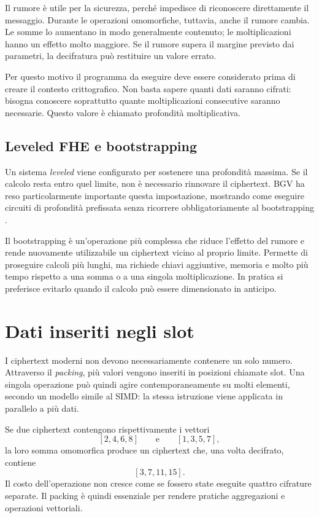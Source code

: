 Il rumore \`e utile per la sicurezza, perch\'e impedisce di riconoscere direttamente il messaggio. Durante le operazioni omomorfiche, tuttavia, anche il rumore cambia. Le somme lo aumentano in modo generalmente contenuto; le moltiplicazioni hanno un effetto molto maggiore. Se il rumore supera il margine previsto dai parametri, la decifratura pu\`o restituire un valore errato.

Per questo motivo il programma da eseguire deve essere considerato prima di creare il contesto crittografico. Non basta sapere quanti dati saranno cifrati: bisogna conoscere soprattutto quante moltiplicazioni consecutive saranno necessarie. Questo valore \`e chiamato profondit\`a moltiplicativa.

\subsection{Leveled FHE e bootstrapping}
Un sistema \emph{leveled} viene configurato per sostenere una profondit\`a massima. Se il calcolo resta entro quel limite, non \`e necessario rinnovare il ciphertext. BGV ha reso particolarmente importante questa impostazione, mostrando come eseguire circuiti di profondit\`a prefissata senza ricorrere obbligatoriamente al bootstrapping \cite{bgv}.

Il bootstrapping \`e un'operazione pi\`u complessa che riduce l'effetto del rumore e rende nuovamente utilizzabile un ciphertext vicino al proprio limite. Permette di proseguire calcoli pi\`u lunghi, ma richiede chiavi aggiuntive, memoria e molto pi\`u tempo rispetto a una somma o a una singola moltiplicazione. In pratica si preferisce evitarlo quando il calcolo pu\`o essere dimensionato in anticipo.

\section{Dati inseriti negli slot}
I ciphertext moderni non devono necessariamente contenere un solo numero. Attraverso il \emph{packing}, pi\`u valori vengono inseriti in posizioni chiamate slot. Una singola operazione pu\`o quindi agire contemporaneamente su molti elementi, secondo un modello simile al SIMD: la stessa istruzione viene applicata in parallelo a pi\`u dati.

Se due ciphertext contengono rispettivamente i vettori
\[
[2,4,6,8]
\qquad\text{e}\qquad
[1,3,5,7],
\]
la loro somma omomorfica produce un ciphertext che, una volta decifrato, contiene
\[
[3,7,11,15].
\]
Il costo dell'operazione non cresce come se fossero state eseguite quattro cifrature separate. Il packing \`e quindi essenziale per rendere pratiche aggregazioni e operazioni vettoriali.

